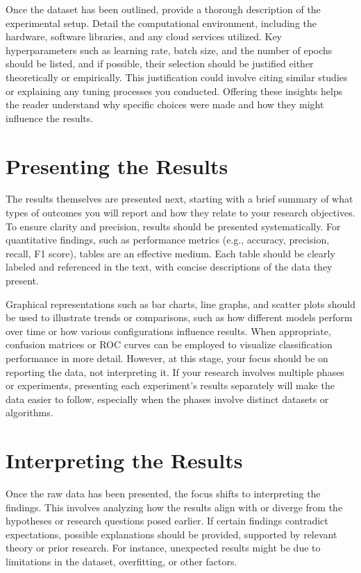 \documentclass{iutbscthesis}
\begin{document}
Once the dataset has been outlined, provide a thorough description of the experimental setup. Detail the computational environment, including the hardware, software libraries, and any cloud services utilized. Key hyperparameters such as learning rate, batch size, and the number of epochs should be listed, and if possible, their selection should be justified either theoretically or empirically. This justification could involve citing similar studies or explaining any tuning processes you conducted. Offering these insights helps the reader understand why specific choices were made and how they might influence the results.

\section{Presenting the Results}

The results themselves are presented next, starting with a brief summary of what types of outcomes you will report and how they relate to your research objectives. To ensure clarity and precision, results should be presented systematically. For quantitative findings, such as performance metrics (e.g., accuracy, precision, recall, F1 score), tables are an effective medium. Each table should be clearly labeled and referenced in the text, with concise descriptions of the data they present.

Graphical representations such as bar charts, line graphs, and scatter plots should be used to illustrate trends or comparisons, such as how different models perform over time or how various configurations influence results. When appropriate, confusion matrices or ROC curves can be employed to visualize classification performance in more detail. However, at this stage, your focus should be on reporting the data, not interpreting it. If your research involves multiple phases or experiments, presenting each experiment's results separately will make the data easier to follow, especially when the phases involve distinct datasets or algorithms.

\section{Interpreting the Results}

Once the raw data has been presented, the focus shifts to interpreting the findings. This involves analyzing how the results align with or diverge from the hypotheses or research questions posed earlier. If certain findings contradict expectations, possible explanations should be provided, supported by relevant theory or prior research. For instance, unexpected results might be due to limitations in the dataset, overfitting, or other factors.
\end{document}
